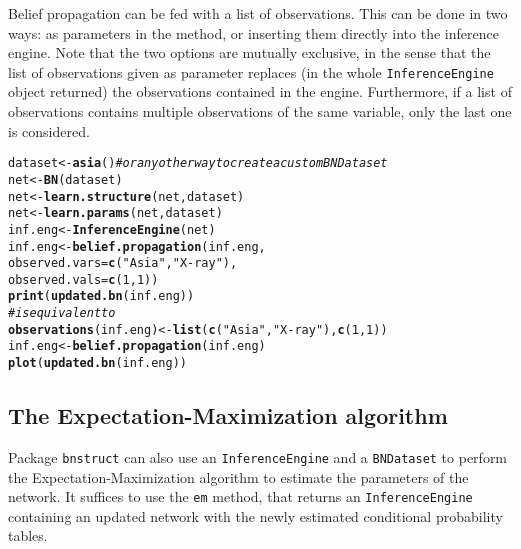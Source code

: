 \documentclass{article}\usepackage[]{graphicx}\usepackage[]{color}
\makeatletter
\newcommand{\hlnum}[1]{\textcolor[rgb]{0.686,0.059,0.569}{#1}}%
\newcommand{\hlstr}[1]{\textcolor[rgb]{0.192,0.494,0.8}{#1}}%
\newcommand{\hlcom}[1]{\textcolor[rgb]{0.678,0.584,0.686}{\textit{#1}}}%
\newcommand{\hlstd}[1]{\textcolor[rgb]{0.345,0.345,0.345}{#1}}%
\newcommand{\hlkwb}[1]{\textcolor[rgb]{0.69,0.353,0.396}{#1}}%
\newcommand{\hlkwc}[1]{\textcolor[rgb]{0.333,0.667,0.333}{#1}}%
\newcommand{\hlkwd}[1]{\textcolor[rgb]{0.737,0.353,0.396}{\textbf{#1}}}%
\newenvironment{kframe}{%
 \def\at@end@of@kframe{}%
 \ifinner\ifhmode%
  \def\at@end@of@kframe{\end{minipage}}%
  \begin{minipage}{\columnwidth}%
 \fi\fi%
 \def\FrameCommand##1{\hskip\@totalleftmargin \hskip-\fboxsep
 \colorbox{shadecolor}{##1}\hskip-\fboxsep
     \hskip-\linewidth \hskip-\@totalleftmargin \hskip\columnwidth}%
 \MakeFramed {\advance\hsize-\width
   \@totalleftmargin\z@ \linewidth\hsize
   \@setminipage}}%
 {\par\unskip\endMakeFramed%
 \at@end@of@kframe}
\newenvironment{knitrout}{}{} %
\newcommand{\Robject}[1]{{\texttt{#1}}}
\newcommand{\Rpackage}[1]{{\texttt{#1}}}
\newcommand{\Rmethod}[1]{{\texttt{#1}}}
\makeatother
\begin{document}
Belief propagation can be fed with a list of observations. This can be done in two ways: as parameters in the method,
or inserting them directly into the inference engine. Note that the two options are mutually exclusive, in the sense that
the list of observations given as parameter replaces (in the whole \Robject{InferenceEngine} object returned)
the observations contained in the engine. Furthermore, if a list of observations contains multiple observations
of the same variable, only the last one is considered.
\begin{knitrout}
\color{fgcolor}\begin{kframe}
\begin{alltt}
\hlstd{dataset} \hlkwb{<-} \hlkwd{asia}\hlstd{()} \hlcom{# or any other way to create a custom BNDataset}
\hlstd{net}     \hlkwb{<-} \hlkwd{BN}\hlstd{(dataset)}
\hlstd{net}     \hlkwb{<-} \hlkwd{learn.structure}\hlstd{(net, dataset)}
\hlstd{net}     \hlkwb{<-} \hlkwd{learn.params}\hlstd{(net, dataset)}
\hlstd{inf.eng} \hlkwb{<-} \hlkwd{InferenceEngine}\hlstd{(net)}
\hlstd{inf.eng} \hlkwb{<-} \hlkwd{belief.propagation}\hlstd{(inf.eng,}
                              \hlkwc{observed.vars} \hlstd{=} \hlkwd{c}\hlstd{(}\hlstr{"Asia"}\hlstd{,}\hlstr{"X-ray"}\hlstd{),}
                              \hlkwc{observed.vals} \hlstd{=} \hlkwd{c}\hlstd{(}\hlnum{1}\hlstd{,}\hlnum{1}\hlstd{))}
\hlkwd{print}\hlstd{(}\hlkwd{updated.bn}\hlstd{(inf.eng))}
\hlcom{# is equivalent to}
\hlkwd{observations}\hlstd{(inf.eng)} \hlkwb{<-} \hlkwd{list}\hlstd{(}\hlkwd{c}\hlstd{(}\hlstr{"Asia"}\hlstd{,}\hlstr{"X-ray"}\hlstd{),} \hlkwd{c}\hlstd{(}\hlnum{1}\hlstd{,}\hlnum{1}\hlstd{))}
\hlstd{inf.eng} \hlkwb{<-} \hlkwd{belief.propagation}\hlstd{(inf.eng)}
\hlkwd{plot}\hlstd{(}\hlkwd{updated.bn}\hlstd{(inf.eng))}
\end{alltt}
\end{kframe}
\end{knitrout}

\subsection{The Expectation-Maximization algorithm}
Package \Rpackage{bnstruct} can also use an \Robject{InferenceEngine} and a \Robject{BNDataset} to perform
the Expectation-Maximization algorithm to estimate the parameters of the network.
It suffices to use the \Rmethod{em} method, that returns an \Robject{InferenceEngine} containing
an updated network with the newly estimated conditional probability tables.
\end{document}
